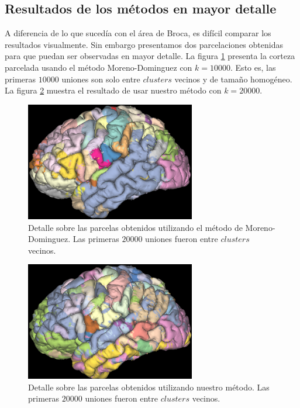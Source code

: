\subsection{Resultados de los m\'etodos en mayor detalle}
\label{sec:acercamiento_corteza}

A diferencia de lo que suced\'ia con el \'area de Broca, es dif\'icil
comparar
los resultados visualmente. Sin embargo presentamos dos parcelaciones
obtenidas para que puedan ser observadas en mayor detalle. La figura 
\ref{fig:vs_moreno} presenta la corteza parcelada usando el m\'etodo 
Moreno-Dominguez con $k=10000$. Esto es, las primeras $10000$ uniones
son solo entre $clusters$ vecinos y de tama\~no homog\'eneo. La figura 
\ref{fig:vs_nosotros} muestra el resultado de usar nuestro m\'etodo con
$k=20000$.

\begin{figure}[h!]
    \centering
    \includegraphics[width=0.66\textwidth]{img/all_brain/vs_moreno.png}
    \caption{Detalle sobre las parcelas obtenidos utilizando 
             el m\'etodo de Moreno-Dominguez. Las primeras $20000$
             uniones fueron entre $clusters$ vecinos. }    
    \label{fig:vs_moreno}
\end{figure}

\begin{figure}[h!]
    \centering
    \includegraphics[width=0.66\textwidth]{img/all_brain/vs_nuestro.png}
    \caption{Detalle sobre las parcelas obtenidos utilizando 
             nuestro m\'etodo. Las primeras $20000$
             uniones fueron entre $clusters$ vecinos. }    
    \label{fig:vs_nosotros}
\end{figure}


